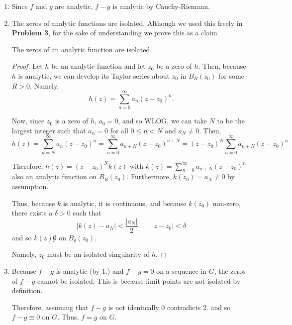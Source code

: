 \documentclass[12pt]{Homework}
\begin{document}
\begin{solution}$\,$
\begin{center}
\end{center}
\begin{enumerate}
    \item Since $f$ and $g$ are analytic, $f-g$ is analytic by Cauchy-Riemann.
    \item The zeros of analytic functions are isolated. Although we used this freely in \textbf{Problem 3}, for the sake of understanding we prove this as a claim.
    \begin{claim} The zeros of an analytic function are isolated.
    \begin{proof} Let $h$ be an analytic function and let $z_0$ be a zero of $h.$ Then, because $h$ is analytic, we can develop its Taylor series about $z_0$ in $B_R(z_0)$ for some $R>0$. Namely, $$h(z)=\sum_{n=0}^\infty a_n(z-z_0)^n.$$ 
    
    Now, since $z_0$ is a zero of $h$, $a_0=0$, and so WLOG, we can take $N$ to be the largest integer such that $a_n=0$ for all $0\le n<N$ and $a_N\not=0$. Then, $$h(z)=\sum_{n=N}^\infty a_n(z-z_0)^n=\sum_{n=0}^\infty a_{n+N}(z-z_0)^{n+N}=(z-z_0)^N\sum_{n=0}^\infty a_{n+N}(z-z_0)^n$$
    
    Therefore, $h(z)=(z-z_0)^Nk(z)$ with $k(z)=\sum_{n=0}^\infty a_{n+N}(z-z_0)^n$ also an analytic function on $B_R(z_0)$. Furthermore, $k(z_0)=a_N\not=0$ by assumption.
    
    Thus, because $k$ is analytic, it is continuous, and because $k(z_0)$ non-zero, there exists a $\delta>0$ such that $$|k(z)-a_N|<\frac{|a_N|}{2}\qquad |z-z_0|<\delta$$ and so $k(z)\not0$ on $B_\delta(z_0)$.
    
    Namely, $z_0$ must be an isolated singularity of $h$.
    \end{proof}
    \end{claim}
    \item Because $f-g$ is analytic (by 1.) and $f-g=0$ on a sequence in $G$, the zeros of $f-g$ cannot be isolated. This is because limit points are not isolated by definition. 
    
    Therefore, assuming that $f-g$ is not identically $0$ contradicts 2. and so $f-g\equiv 0$ on $G$. Thus, $f=g$ on $G.$
\end{enumerate}
\end{solution}
\end{document}
